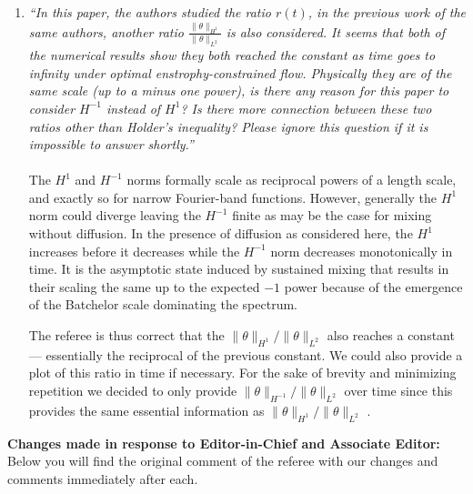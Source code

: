 \documentclass[]{article}
\begin{document}
\begin{enumerate}
\item {\it ``In this paper, the authors studied the ratio $r(t)$, in the previous work of the same authors, another ratio $\frac{\|\theta\|_{H^{1}}}{\|\theta\|_{L^2}}$ is also considered. It seems that both of the numerical results show they both reached the constant as time goes to infinity under optimal enstrophy-constrained flow. Physically they are of the same scale (up to a minus one power), is there any reason for this paper to consider $H^{-1}$ instead of $H^1$? Is there more connection between these two ratios other than Holder's inequality? Please ignore this question if it is impossible to answer shortly.''}\\
\\
The $H^{1}$ and $H^{-1}$ norms formally scale as reciprocal powers of a length scale, and exactly so for narrow Fourier-band functions. However, generally the $H^{1}$ norm could diverge leaving the $H^{-1}$ finite as may be the case for mixing without diffusion. In the presence of diffusion as considered here, the $H^{1}$ increases before it decreases while the $H^{-1}$ norm decreases monotonically in time. It is the asymptotic state induced by sustained mixing that results in their scaling the same up to the expected $-1$ power because of the emergence of the Batchelor scale dominating the spectrum.

The referee is thus correct that the $\|\theta\|_{H^{1}}/\|\theta\|_{L^2}$ also reaches a constant --- essentially the reciprocal of the previous constant. We could also provide a plot of this ratio in time if necessary. For the sake of brevity and minimizing repetition we decided to only provide $\|\theta\|_{H^{-1}}/\|\theta\|_{L^2}$ over time since this provides the same essential information as $\|\theta\|_{H^{1}}/\|\theta\|_{L^2}$ . 

\end{enumerate}

{\bf Changes made in response to Editor-in-Chief and Associate Editor:} Below you will find the original comment of the referee with our changes and comments immediately after each.
\end{document}
